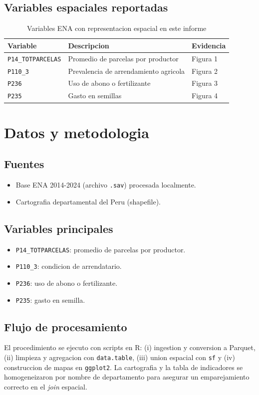 \documentclass[11pt,a4paper]{article}
\begin{document}
\subsection{Variables espaciales reportadas}
\begin{table}[H]
\centering
\caption{Variables ENA con representacion espacial en este informe}
\begin{tabular}{@{}lll@{}}
\toprule
\textbf{Variable} & \textbf{Descripcion} & \textbf{Evidencia} \\ \midrule
\texttt{P14\_TOTPARCELAS} & Promedio de parcelas por productor & Figura 1 \\
\texttt{P110\_3} & Prevalencia de arrendamiento agricola & Figura 2 \\
\texttt{P236} & Uso de abono o fertilizante & Figura 3 \\
\texttt{P235} & Gasto en semillas & Figura 4 \\ \bottomrule
\end{tabular}
\end{table}

\section{Datos y metodologia}
\subsection{Fuentes}
\begin{itemize}
    \item Base ENA 2014-2024 (archivo \texttt{.sav}) procesada localmente.
    \item Cartografia departamental del Peru (shapefile).
\end{itemize}

\subsection{Variables principales}
\begin{itemize}
    \item \texttt{P14\_TOTPARCELAS}: promedio de parcelas por productor.
    \item \texttt{P110\_3}: condicion de arrendatario.
    \item \texttt{P236}: uso de abono o fertilizante.
    \item \texttt{P235}: gasto en semilla.
\end{itemize}

\subsection{Flujo de procesamiento}
El procedimiento se ejecuto con scripts en R: (i) ingestion y conversion a Parquet, (ii) limpieza y agregacion con \texttt{data.table}, (iii) union espacial con \texttt{sf} y (iv) construccion de mapas en \texttt{ggplot2}. La cartografia y la tabla de indicadores se homogeneizaron por nombre de departamento para asegurar un emparejamiento correcto en el \textit{join} espacial.
\end{document}
